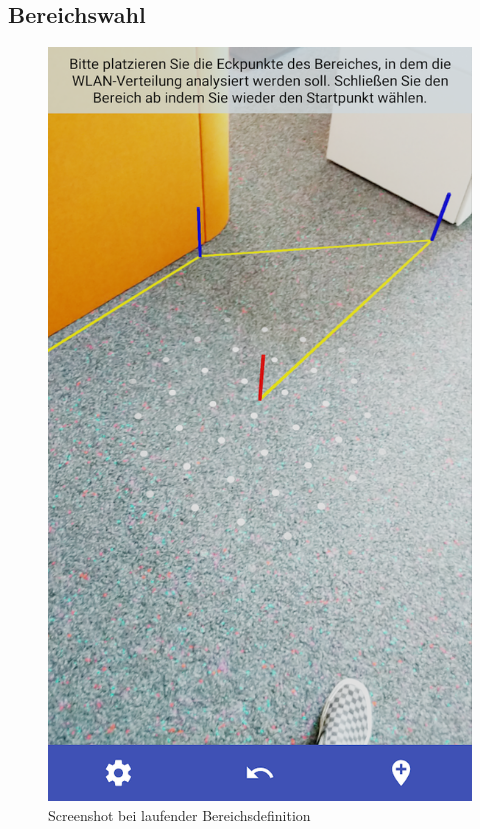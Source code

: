\documentclass[10pt]{scrartcl}
\begin{document}
\subsection{Bereichswahl}
\label{Bereichswahl}
\begin{figure}
\centering
\includegraphics[scale=0.35]{images/bereichsdefinition.png}
\caption{\label{img:bereichsdefinition}Screenshot bei laufender Bereichsdefinition}
\end{figure}
\end{document}
